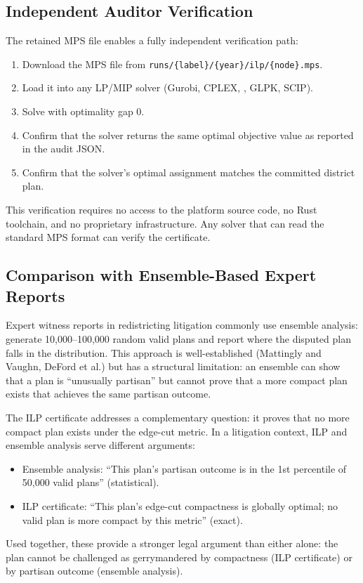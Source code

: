 \subsection{Independent Auditor Verification}

The retained MPS file enables a fully independent verification path:

\begin{enumerate}
\item Download the MPS file from \texttt{runs/\{label\}/\{year\}/ilp/\{node\}.mps}.
\item Load it into any LP/MIP solver (Gurobi, CPLEX, \highs{}, GLPK, SCIP).
\item Solve with optimality gap 0.
\item Confirm that the solver returns the same optimal objective value
  as reported in the audit JSON.
\item Confirm that the solver's optimal assignment matches the committed
  district plan.
\end{enumerate}

This verification requires no access to the platform source code,
no Rust toolchain, and no proprietary infrastructure.
Any solver that can read the standard MPS format can verify the certificate.

\subsection{Comparison with Ensemble-Based Expert Reports}

Expert witness reports in redistricting litigation commonly use
ensemble analysis: generate 10{,}000--100{,}000 random valid plans
and report where the disputed plan falls in the distribution.
This approach is well-established (Mattingly and Vaughn, DeFord et al.)
but has a structural limitation: an ensemble can show that a plan is
``unusually partisan'' but cannot prove that a more compact plan exists
that achieves the same partisan outcome.

The ILP certificate addresses a complementary question: it proves that
no more compact plan exists under the edge-cut metric.
In a litigation context, ILP and ensemble analysis serve different
arguments:

\begin{itemize}
\item Ensemble analysis: ``This plan's partisan outcome is in the 1st
  percentile of 50{,}000 valid plans'' (statistical).
\item ILP certificate: ``This plan's edge-cut compactness is globally
  optimal; no valid plan is more compact by this metric'' (exact).
\end{itemize}

Used together, these provide a stronger legal argument than either
alone: the plan cannot be challenged as gerrymandered by compactness
(ILP certificate) or by partisan outcome (ensemble analysis).
